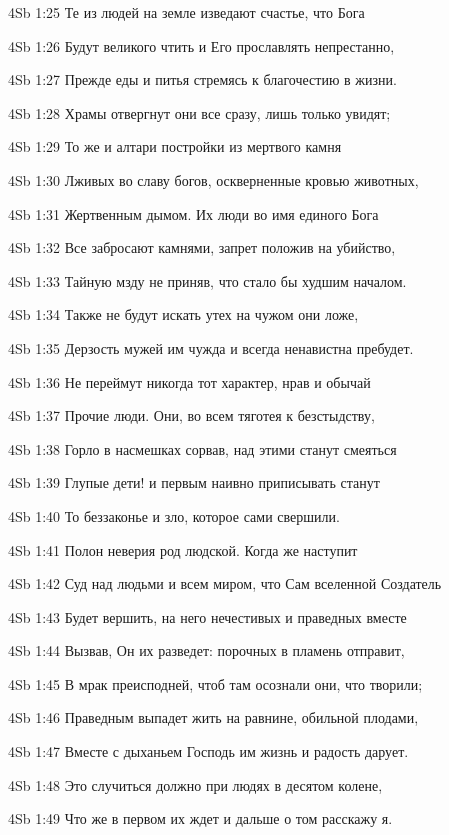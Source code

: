 \vs 4Sb 1:25 Те из людей на земле изведают счастье, что Бога 

\vs 4Sb 1:26 Будут великого чтить и Его прославлять непрестанно, 

\vs 4Sb 1:27 Прежде еды и питья стремясь к благочестию в жизни. 

\vs 4Sb 1:28 Храмы отвергнут они все сразу, лишь только увидят;

\vs 4Sb 1:29 То же и алтари  постройки из мертвого камня 

\vs 4Sb 1:30 Лживых во славу богов, оскверненные кровью животных, 

\vs 4Sb 1:31 Жертвенным дымом. Их люди во имя единого Бога 

\vs 4Sb 1:32 Все забросают камнями, запрет положив на убийство, 

\vs 4Sb 1:33 Тайную мзду не приняв, что стало бы худшим началом. 

\vs 4Sb 1:34 Также не будут искать утех на чужом они ложе, 

\vs 4Sb 1:35 Дерзость мужей им чужда и всегда ненавистна пребудет.

\vs 4Sb 1:36 Не переймут никогда тот характер, нрав и обычай 

\vs 4Sb 1:37 Прочие люди. Они, во всем тяготея к безстыдству, 

\vs 4Sb 1:38 Горло в насмешках сорвав, над этими станут смеяться  

\vs 4Sb 1:39 Глупые дети!  и первым наивно приписывать станут 

\vs 4Sb 1:40 То беззаконье и зло, которое сами свершили.

\vs 4Sb 1:41 Полон неверия род людской. Когда же наступит

\vs 4Sb 1:42 Суд над людьми и всем миром, что Сам вселенной Создатель 

\vs 4Sb 1:43 Будет вершить, на него нечестивых и праведных вместе 

\vs 4Sb 1:44 Вызвав,  Он их разведет: порочных в пламень отправит, 

\vs 4Sb 1:45 В мрак преисподней, чтоб там осознали они, что творили;

\vs 4Sb 1:46 Праведным выпадет жить на равнине, обильной плодами, 

\vs 4Sb 1:47 Вместе с дыханьем Господь им жизнь и радость дарует. 

\vs 4Sb 1:48 Это случиться должно при людях в десятом колене, 

\vs 4Sb 1:49 Что же в первом их ждет и дальше  о том расскажу я.

